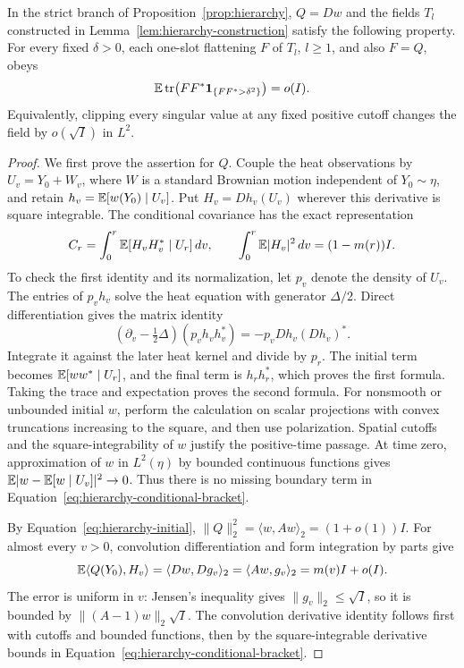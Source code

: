 \begin{lemma}\label{lem:hierarchy-operator-tails}
In the strict branch of Proposition~\ref{prop:hierarchy}, $Q=Dw$ and
the fields $T_l$ constructed in Lemma~\ref{lem:hierarchy-construction}
satisfy the following property.  For every fixed $\delta>0$, each
one-slot flattening $F$ of $T_l$, $l\ge1$, and also $F=Q$, obeys
\begin{equation}\label{eq:hierarchy-operator-tail}
 \mathbb E\operatorname{tr}\bigl(FF^*\mathbf 1_{\{FF^*>\delta^2\}}\bigr)=o(I).
\end{equation}
Equivalently, clipping every singular value at any fixed positive cutoff
changes the field by $o(\sqrt I)$ in $L^2$.
\end{lemma}

\begin{proof}
We first prove the assertion for $Q$.  Couple the heat observations by
$U_v=Y_0+W_v$, where $W$ is a standard Brownian motion independent of
$Y_0\sim\eta$, and retain $h_v=\mathbb E[w(Y_0)\mid U_v]$.  Put
$H_v=Dh_v(U_v)$ wherever this derivative is square integrable.  The
conditional covariance has the exact representation
\begin{equation}\label{eq:hierarchy-conditional-bracket}
 C_r=\int_0^r\mathbb E[H_vH_v^*\mid U_r]\,dv,
 \qquad
 \int_0^r\mathbb E|H_v|^2\,dv=(1-m(r))I.
\end{equation}
To check the first identity and its normalization, let $p_v$ denote the
density of $U_v$.  The entries of $p_vh_v$ solve the heat equation with
generator $\Delta/2$.  Direct differentiation gives the matrix identity
\[
 (\partial_v-\tfrac12\Delta)(p_vh_vh_v^*)
 =-p_vDh_v(Dh_v)^*.
\]
Integrate it against the later heat kernel and divide by $p_r$.  The
initial term becomes $\mathbb E[ww^*\mid U_r]$, and the final term is
$h_rh_r^*$, which proves the first formula.  Taking the trace and
expectation proves the second formula.  For nonsmooth or unbounded
initial $w$, perform the calculation on scalar projections with convex
truncations increasing to the square, and then use polarization.  Spatial
cutoffs and the square-integrability of $w$ justify the positive-time
passage.  At time zero, approximation of $w$ in $L^2(\eta)$ by bounded
continuous functions gives
$\mathbb E|w-\mathbb E[w\mid U_v]|^2\to0$.  Thus there is no missing boundary term
in Equation~\eqref{eq:hierarchy-conditional-bracket}.

By Equation~\eqref{eq:hierarchy-initial},
$\|Q\|_2^2=\langle w,Aw\rangle_2=(1+o(1))I$.
For almost every $v>0$, convolution differentiation and form integration
by parts give
\begin{equation}\label{eq:hierarchy-derivative-correlation}
 \mathbb E\langle Q(Y_0),H_v\rangle
 =\langle Dw,Dg_v\rangle_2
 =\langle Aw,g_v\rangle_2=m(v)I+o(I).
\end{equation}
The error is uniform in $v$: Jensen's inequality gives
$\|g_v\|_2\le\sqrt I$, so it is bounded by
$\|(A-1)w\|_2\sqrt I$.  The convolution derivative identity follows
first with cutoffs and bounded functions, then by the square-integrable
derivative bounds in Equation~\eqref{eq:hierarchy-conditional-bracket}.


\end{proof}
